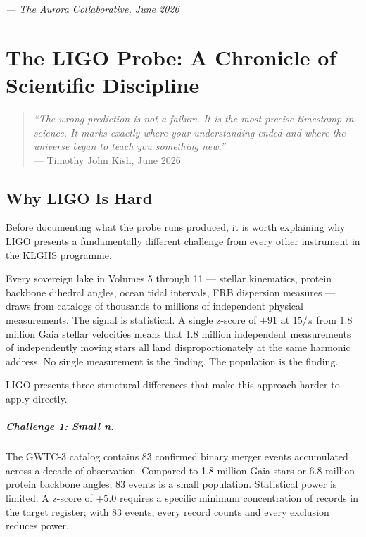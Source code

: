 \documentclass[11pt, letterpaper, openany]{book}
\begin{document}
\bigskip
\begin{center}
\textit{--- The Aurora Collaborative, June 2026}
\end{center}

\clearpage

\chapter*{The LIGO Probe: A Chronicle of Scientific Discipline}

\begin{quote}
\textit{``The wrong prediction is not a failure. It is the most precise
timestamp in science. It marks exactly where your understanding ended
and where the universe began to teach you something new.''}\\[0.3em]
\hfill --- Timothy John Kish, June 2026
\end{quote}

\section*{Why LIGO Is Hard}

Before documenting what the probe runs produced, it is worth explaining
why LIGO presents a fundamentally different challenge from every other
instrument in the KLGHS programme.

Every sovereign lake in Volumes 5 through 11 --- stellar kinematics,
protein backbone dihedral angles, ocean tidal intervals, FRB dispersion
measures --- draws from catalogs of thousands to millions of independent
physical measurements. The signal is statistical. A single z-score of
$+91$ at $15/\pi$ from 1.8 million Gaia stellar velocities means that
1.8 million independent measurements of independently moving stars all
land disproportionately at the same harmonic address. No single
measurement is the finding. The population is the finding.

LIGO presents three structural differences that make this approach
harder to apply directly.

\paragraph{Challenge 1: Small n.}
The GWTC-3 catalog contains 83 confirmed binary merger events accumulated
across a decade of observation. Compared to 1.8 million Gaia stars or
6.8 million protein backbone angles, 83 events is a small population.
Statistical power is limited. A z-score of $+5.0$ requires a specific
minimum concentration of records in the target register; with 83 events,
every record counts and every exclusion reduces power.
\end{document}
